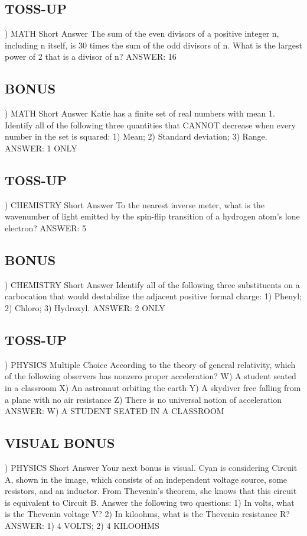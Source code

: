 \documentclass{article}
\begin{document}
\subsection*{TOSS-UP}
) MATH Short Answer The sum of the even divisors of a positive integer n, including n itself, is 30 times the sum of the odd divisors of n. What is the largest power of 2 that is a divisor of n?
\noindent ANSWER: 16

\subsection*{BONUS}
) MATH Short Answer Katie has a finite set of real numbers with mean 1. Identify all of the following three quantities that CANNOT decrease when every number in the set is squared: 1) Mean; 2) Standard deviation; 3) Range.
\noindent ANSWER: 1 ONLY

\subsection*{TOSS-UP}
) CHEMISTRY Short Answer To the nearest inverse meter, what is the wavenumber of light emitted by the spin-flip transition of a hydrogen atom's lone electron?
\noindent ANSWER: 5

\subsection*{BONUS}
) CHEMISTRY Short Answer Identify all of the following three substituents on a carbocation that would destabilize the adjacent positive formal charge: 1) Phenyl; 2) Chloro; 3) Hydroxyl.
\noindent ANSWER: 2 ONLY

\subsection*{TOSS-UP}
) PHYSICS Multiple Choice According to the theory of general relativity, which of the following observers has nonzero proper acceleration?
\noindent W) A student seated in a classroom
\noindent X) An astronaut orbiting the earth
\noindent Y) A skydiver free falling from a plane with no air resistance
\noindent Z) There is no universal notion of acceleration
\noindent ANSWER: W) A STUDENT SEATED IN A CLASSROOM

\subsection*{VISUAL BONUS}
) PHYSICS Short Answer Your next bonus is visual. Cyan is considering Circuit A, shown in the image, which consists of an independent voltage source, some resistors, and an inductor. From Thevenin's theorem, she knows that this circuit is equivalent to Circuit B. Answer the following two questions: 1) In volts, what is the Thevenin voltage V? 2) In kiloohms, what is the Thevenin resistance R?
\noindent ANSWER: 1) 4 VOLTS; 2) 4 KILOOHMS
\end{document}
